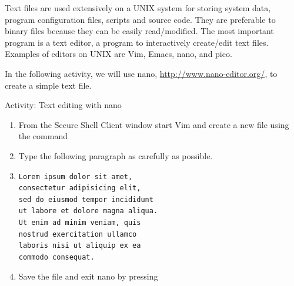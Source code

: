 Text files are used extensively on a UNIX system for storing system data,
program configuration files, scripts and source code. They are preferable to
binary files because they can be easily read/modified.  The most important
program is a text editor, a program to interactively create/edit text files.
Examples of editors on UNIX are Vim, Emacs, nano, and pico. 

\begin{frame}
\end{frame}


In the following activity, we will use nano, \url{http://www.nano-editor.org/}, to create a simple text file. 

\begin{frame}[fragile]{Activity: Text editing with nano}
\begin{enumerate}
\item From the Secure Shell Client window start Vim and create a new file using
the command 
\item Type the following paragraph as carefully as possible.  
\item 
\begin{verbatim}
Lorem ipsum dolor sit amet,
consectetur adipisicing elit,
sed do eiusmod tempor incididunt
ut labore et dolore magna aliqua.
Ut enim ad minim veniam, quis
nostrud exercitation ullamco
laboris nisi ut aliquip ex ea
commodo consequat.
\end{verbatim}

\item Save the file and exit nano by pressing 
\end{enumerate}
\end{frame}


